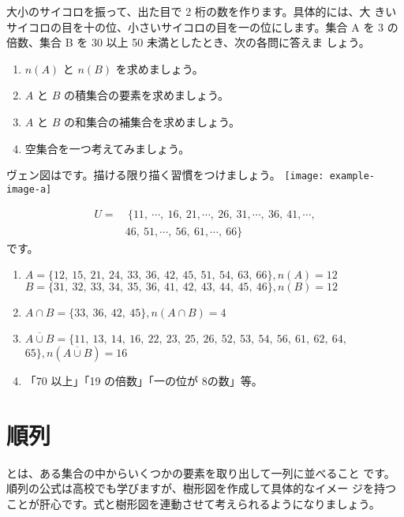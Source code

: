 \begin{simQ}
大小のサイコロを振って、出た目で 2 桁の数を作ります。具体的には、大 きいサイコロの目を十の位、小さいサイコロの目を一の位にします。集合 A を 3 の倍数、集合 B を 30 以上 50 未満としたとき、次の各問に答えま しょう。
\begin{enumerate}[label=(\arabic*), itemsep=0pt, parsep=0pt]
\item $n(A)$ と $n(B)$ を求めましょう。 
\item $A$ と $B$ の積集合の要素を求めましょう。
\item $A$ と $B$ の和集合の補集合を求めましょう。 
\item 空集合を一つ考えてみましょう。
\end{enumerate}
\end{simQ}
\begin{simA}
    ヴェン図はです。描ける限り描く習慣をつけましょう。
    {\centering
    \texttt{[image: example-image-a]}
    }

    \begin{align*}
        U = &\ \{11,~\cdots,~16,~ 21,\cdots,~26,~31,\cdots,~36,~41,\cdots,\\
            &46,~51,\cdots ,~56,~61,\cdots,~66\}
    \end{align*}
    です。
    
    \begin{enumerate}[label=(\arabic*), itemsep=0pt, parsep=0pt]
        \item $A = \{12,\ 15,\ 21,\ 24,\ 33,\ 36,\ 42,\ 45,\ 51,\ 54,\ 63,\ 66\}, n(A) = 12$ \\
        $B = \{31,\ 32,\ 33,\ 34,\ 35,\ 36,\ 41,\ 42,\ 43,\ 44,\ 45,\ 46\}, n(B) = 12$
        \item $A \cap B = \{33,\ 36,\ 42,\ 45\}, n(A \cap B) = 4$
        \item $\overline{A \cup B} = \{11,\ 13,\ 14,\ 16,\ 22,\ 23,\ 25,\ 26,\ 52,\ 53,\ 54,\ 56,\ 61,\ 62,\ 64,$ $65\}, n(\overline{A \cup B})=16$
        \item 「70 以上」「19 の倍数」「一の位が 8の数」等。
    \end{enumerate}
\end{simA}

\section{順\quad 列}
とは、ある集合の中からいくつかの要素を取り出して一列に並べること です。順列の公式は高校でも学びますが、樹形図を作成して具体的なイメー ジを持つことが肝心です。式と樹形図を連動させて考えられるようになりましょう。

